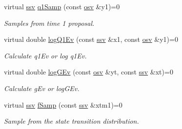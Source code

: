 \begin{DoxyCompactItemize}
virtual \hyperlink{classBSFilter_acc4caec4908ad134814082c39c3b8bef}{ssv} \hyperlink{classBSFilter_a01492b7851a9423555112844a7b3c3d3}{q1\+Samp} (const \hyperlink{classBSFilter_aea27600dd7c5af20fa7a0fc57f18b0a2}{osv} \&y1)=0
\begin{DoxyCompactList}\small\item\em Samples from time 1 proposal. \end{DoxyCompactList}\item 
virtual double \hyperlink{classBSFilter_af7be6fa01b64b3969d22e916fd90232b}{log\+Q1\+Ev} (const \hyperlink{classBSFilter_acc4caec4908ad134814082c39c3b8bef}{ssv} \&x1, const \hyperlink{classBSFilter_aea27600dd7c5af20fa7a0fc57f18b0a2}{osv} \&y1)=0
\begin{DoxyCompactList}\small\item\em Calculate q1\+Ev or log q1\+Ev. \end{DoxyCompactList}\item 
virtual double \hyperlink{classBSFilter_a9b3170ecbc77f0f732562661cd06bb22}{log\+G\+Ev} (const \hyperlink{classBSFilter_aea27600dd7c5af20fa7a0fc57f18b0a2}{osv} \&yt, const \hyperlink{classBSFilter_acc4caec4908ad134814082c39c3b8bef}{ssv} \&xt)=0
\begin{DoxyCompactList}\small\item\em Calculate g\+Ev or log\+G\+Ev. \end{DoxyCompactList}\item 
virtual \hyperlink{classBSFilter_acc4caec4908ad134814082c39c3b8bef}{ssv} \hyperlink{classBSFilter_a539856de458902935668d3c9a93601fe}{f\+Samp} (const \hyperlink{classBSFilter_acc4caec4908ad134814082c39c3b8bef}{ssv} \&xtm1)=0
\begin{DoxyCompactList}\small\item\em Sample from the state transition distribution. \end{DoxyCompactList}\end{DoxyCompactItemize}
